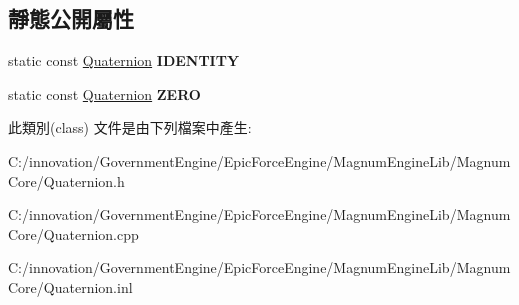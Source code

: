 \subsection*{靜態公開屬性}
\begin{DoxyCompactItemize}
\item 
static const \hyperlink{class_i_dream_sky_1_1_quaternion}{Quaternion} {\bfseries I\+D\+E\+N\+T\+I\+TY}\hypertarget{class_i_dream_sky_1_1_quaternion_ac18490f3704b16fef9c789167913e7a8}{}\label{class_i_dream_sky_1_1_quaternion_ac18490f3704b16fef9c789167913e7a8}

\item 
static const \hyperlink{class_i_dream_sky_1_1_quaternion}{Quaternion} {\bfseries Z\+E\+RO}\hypertarget{class_i_dream_sky_1_1_quaternion_a0bee05cefbc622f8d1f72d3f06a187ed}{}\label{class_i_dream_sky_1_1_quaternion_a0bee05cefbc622f8d1f72d3f06a187ed}

\end{DoxyCompactItemize}


此類別(class) 文件是由下列檔案中產生\+:\begin{DoxyCompactItemize}
\item 
C\+:/innovation/\+Government\+Engine/\+Epic\+Force\+Engine/\+Magnum\+Engine\+Lib/\+Magnum\+Core/Quaternion.\+h\item 
C\+:/innovation/\+Government\+Engine/\+Epic\+Force\+Engine/\+Magnum\+Engine\+Lib/\+Magnum\+Core/Quaternion.\+cpp\item 
C\+:/innovation/\+Government\+Engine/\+Epic\+Force\+Engine/\+Magnum\+Engine\+Lib/\+Magnum\+Core/Quaternion.\+inl\end{DoxyCompactItemize}

